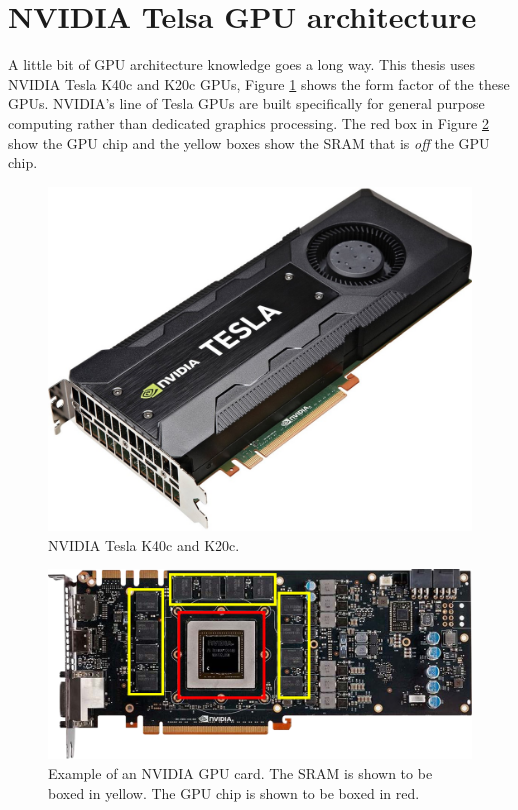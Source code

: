 \section{NVIDIA Telsa GPU architecture}
A little bit of GPU architecture knowledge goes a long way.
This thesis uses NVIDIA Tesla K40c and K20c GPUs, Figure \ref{fig:GPUpicture} shows the form factor of the these GPUs.
NVIDIA's line of Tesla GPUs are built specifically for general purpose computing rather than dedicated graphics processing.
The red box in Figure \ref{fig:GPUarch} show the GPU chip and the yellow boxes show the SRAM that is \textit{off} the GPU chip.
\begin{figure}
	\centering\includegraphics[width=5in]{figures/gpu_intro/k40c_k20c.jpg}
	\caption{NVIDIA Tesla K40c and K20c.}
	\label{fig:GPUpicture}
\end{figure}
\begin{figure}
	\centering\includegraphics[width=\textwidth]{figures/gpu_intro/Kepler_box.png}
	\caption{Example of an NVIDIA GPU card. The SRAM is shown to be boxed in yellow. The GPU chip is shown to be boxed in red.}
	\label{fig:GPUarch}
\end{figure}

